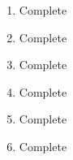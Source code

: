\documentclass[11pt]{article}
\begin{document}

\begin{enumerate}[1)]
	\item Complete
	\item Complete
	\item Complete
	\item Complete
	\item Complete
	\item Complete
\end{enumerate}
\end{document}
